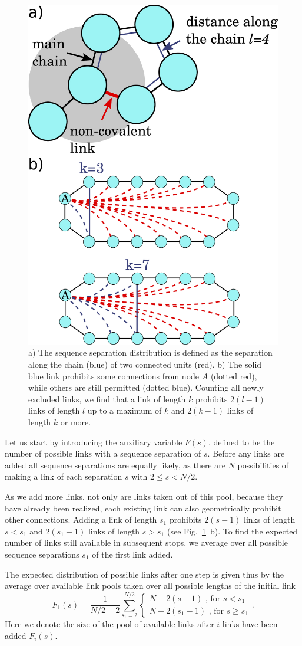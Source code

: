 \documentclass[reprint,amsmath,amssymb,rmp,onecolumn,notitlepage,11pt]{revtex4-1}
\begin{document}
\begin{figure}[h]
    \centering
    \includegraphics[width=0.4\columnwidth]{figures/Fig1.pdf}
    \caption{a) The sequence separation distribution is defined as the separation along the chain (blue) of two connected units (red). b) The solid blue link prohibits some connections from node $A$ (dotted red), while others are still permitted (dotted blue). Counting all newly excluded links, we find that a link of length $k$ prohibits $2(l-1)$ links of length $l$ up to a maximum of $k$ and $2(k-1)$ links of length $k$ or more.}
    \label{fig:schematic}
\end{figure}

Let us start by introducing the auxiliary variable $F(s)$, defined to be the number of possible links with a sequence separation of $s$. Before any links are added all sequence separations are equally likely, as there are $N$ possibilities of making a link of each separation $s$ with $2\leq s < N/2$.

As we add more links, not only are links taken out of this pool, because they have already been realized, each existing link can also geometrically prohibit other connections. Adding a link of length $s_1$ prohibits $2(s-1)$ links of length $s<s_1$ and $2(s_1-1)$ links of length $s>s_1$ (see Fig.~\ref{fig:schematic}~b). To find the expected number of links still available in subsequent stops, we average over all possible sequence separations $s_1$ of the first link added.

The expected distribution of possible links after one step is given thus by the average over available link pools taken over all possible lengths of the initial link
\begin{equation}
    F_1(s)= \frac{1}{N/2-2} \sum_{s_1=2}^{N/2} { \begin{cases}
    N-2(s-1) \text{ , for } s<s_1\\
    N-2(s_1 -1)\text{ , for } s\geq s_1
    \end{cases}}.
\end{equation}
Here we denote the size of the pool of available links after $i$ links have been added $F_i(s)$.
\end{document}
